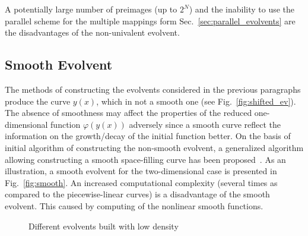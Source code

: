 \documentclass[runningheads]{llncs}
\begin{document}
A potentially large number of preimages (up to $2^N$) and the inability to use the parallel
scheme for the multiple mappings form Sec.~\ref{sec:parallel_evolvents} are the disadvantages
of the non-univalent evolvent.


\subsection{Smooth Evolvent}

The methods of constructing the evolvents considered in the previous paragraphs produce the
curve $y(x)$, which in not a smooth one (see Fig.~\ref{fig:shifted_ev}). The absence of
smoothness may affect the properties of the reduced one-dimensional function $\varphi(y(x))$
adversely since a smooth curve reflect the information on the growth/decay of the initial
function better. On the basis of initial algorithm of constructing the non-smooth evolvent, a
generalized algorithm allowing constructing a smooth space-filling curve has been
proposed~\cite{Goryachih2017}. As an illustration, a smooth evolvent for the two-dimensional
case is presented in Fig.~\ref{fig:smooth}.
An increased computational complexity (several times as compared to the piecewise-linear
curves) is a disadvantage of the smooth evolvent. This caused by computing of the nonlinear smooth
functions.


\begin{figure}[ht]
    \centering
    \caption{Different evolvents built with low density}
\end{figure}
\end{document}
